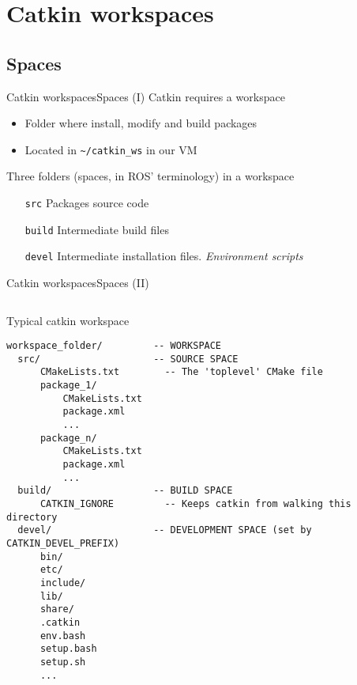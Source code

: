 \documentclass[10pt,compress]{beamer} %
\begin{document}
\section{Catkin workspaces}
\subsection{Spaces}
\begin{frame}[fragile]{Catkin workspaces}{Spaces (I)}
	Catkin requires a \alert{workspace}
	\begin{itemize}
		\item Folder where install, modify and build packages
		\item Located in \texttt{\textasciitilde/catkin\_ws} in our VM
	\end{itemize}
	\vspace{0.6cm}
	Three folders (\alert{spaces}, in ROS' terminology) in a workspace
 	 	\begin{itemize}
		\item[\texttt{src}] Packages source code
		\item[\texttt{build}] Intermediate build files
		\item[\texttt{devel}] Intermediate installation files. \textit{Environment scripts}
		\end{itemize}
\end{frame}

\begin{frame}[fragile]{Catkin workspaces}{Spaces (II)}
\tiny{
    \begin{columns}
	   \begin{block}{Typical catkin workspace}
\begin{verbatim}
workspace_folder/         -- WORKSPACE
  src/                    -- SOURCE SPACE
      CMakeLists.txt        -- The 'toplevel' CMake file
      package_1/
          CMakeLists.txt
          package.xml
          ...
      package_n/
          CMakeLists.txt
          package.xml
          ...
  build/                  -- BUILD SPACE
      CATKIN_IGNORE         -- Keeps catkin from walking this directory
  devel/                  -- DEVELOPMENT SPACE (set by CATKIN_DEVEL_PREFIX)
      bin/
      etc/
      include/
      lib/
      share/
      .catkin
      env.bash
      setup.bash
      setup.sh
      ...
\end{verbatim}
	   \end{block}
	   \end{columns}
	   }
\end{frame}
\end{document}
